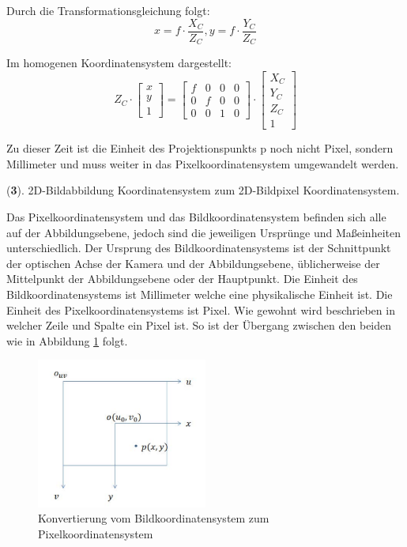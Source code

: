 Durch die Transformationsgleichung folgt: 
\begin{equation}
   x = f \cdot \frac{X_C}{Z_C}, y = f \cdot \frac{Y_C}{Z_C}
\end{equation}

Im homogenen Koordinatensystem dargestellt:
\begin{equation}
   Z_C \cdot \begin{bmatrix}
	x \\  
	y \\
	1
	\end{bmatrix} = \begin{bmatrix}
	f & 0 & 0 & 0	\\
	0 & f & 0 & 0	\\
	0 & 0 & 1 & 0	
	\end{bmatrix} \cdot \begin{bmatrix}
	X_C \\  
	Y_C \\
	Z_C \\
	1
	\end{bmatrix}
\end{equation}

Zu dieser Zeit ist die Einheit des Projektionspunkts p noch nicht Pixel, sondern Millimeter und muss weiter in das Pixelkoordinatensystem umgewandelt werden.

(\textbf{3}). 2D-Bildabbildung Koordinatensystem zum 2D-Bildpixel Koordinatensystem.

Das Pixelkoordinatensystem und das Bildkoordinatensystem befinden sich alle auf der Abbildungsebene, jedoch sind die jeweiligen Ursprünge und Maßeinheiten unterschiedlich. Der Ursprung des Bildkoordinatensystems ist der Schnittpunkt der optischen Achse der Kamera und der Abbildungsebene, üblicherweise der Mittelpunkt der Abbildungsebene oder der Hauptpunkt. Die Einheit des Bildkoordinatensystems ist Millimeter welche eine physikalische Einheit ist. Die Einheit des Pixelkoordinatensystems ist Pixel. Wie gewohnt wird beschrieben in welcher Zeile und Spalte ein Pixel ist. So ist der Übergang zwischen den beiden wie in Abbildung \ref{fig:Konvertierung von Pixelkoordinatensystem zu Bildkoordinatensystem} folgt. 

\begin{figure}[H]
 \centering 
 \includegraphics[keepaspectratio,width=0.5\textwidth]{images/3_Ersteverfahren/Kamera/imagezupixel.pdf}
 \caption{Konvertierung vom Bildkoordinatensystem zum Pixelkoordinatensystem}
 \label{fig:Konvertierung von Pixelkoordinatensystem zu Bildkoordinatensystem}
\end{figure} 

